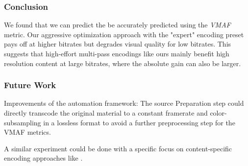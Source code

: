 \subsubsection{Conclusion}
We found that we can predict the be accurately predicted using the \textit{VMAF} metric.
Our aggressive optimization approach with the "expert" encoding preset pays off at higher bitrates but degrades visual quality for low bitrates. This suggests that high-effort multi-pass encodings like ours mainly benefit high resolution content at large bitrates, where the absolute gain can also be larger.


\subsubsection{Future Work}
Improvements of the automation framework: The source Preparation step could directly transcode the original material to a constant framerate and color-subsampling in a lossless format to avoid a further preprocessing step for the VMAF metrics.


A similar experiment could be done with a specific focus on content-specific encoding approaches like \cite{cock:2016:titleencode}.

